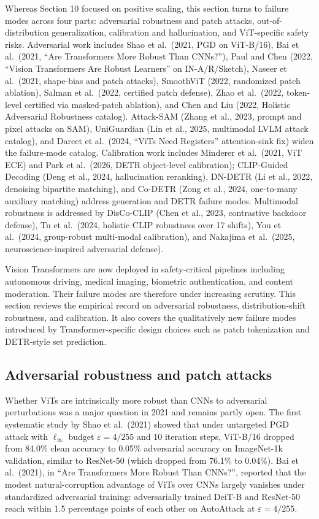 \documentclass{article}
\begin{document}
Whereas Section 10 focused on positive scaling, this section turns to failure modes across four parts: adversarial robustness and patch attacks, out-of-distribution generalization, calibration and hallucination, and ViT-specific safety risks. Adversarial work includes Shao et al.~(2021, PGD on ViT-B/16), Bai et al.~(2021, ``Are Transformers More Robust Than CNNs?''), Paul and Chen (2022, ``Vision Transformers Are Robust Learners'' on IN-A/R/Sketch), Naseer et al.~(2021, shape-bias and patch attacks), SmoothViT (2022, randomized patch ablation), Salman et al.~(2022, certified patch defense), Zhao et al.~(2022, token-level certified via masked-patch ablation), and Chen and Liu (2022, Holistic Adversarial Robustness catalog). Attack-SAM (Zhang et al., 2023, prompt and pixel attacks on SAM), UniGuardian (Lin et al., 2025, multimodal LVLM attack catalog), and Darcet et al.~(2024, ``ViTs Need Registers'' attention-sink fix) widen the failure-mode catalog. Calibration work includes Minderer et al.~(2021, ViT ECE) and Park et al.~(2026, DETR object-level calibration); CLIP-Guided Decoding (Deng et al., 2024, hallucination reranking), DN-DETR (Li et al., 2022, denoising bipartite matching), and Co-DETR (Zong et al., 2024, one-to-many auxiliary matching) address generation and DETR failure modes. Multimodal robustness is addressed by DisCo-CLIP (Chen et al., 2023, contrastive backdoor defense), Tu et al.~(2024, holistic CLIP robustness over 17 shifts), You et al.~(2024, group-robust multi-modal calibration), and Nakajima et al.~(2025, neuroscience-inspired adversarial defense).

Vision Transformers are now deployed in safety-critical pipelines including autonomous driving, medical imaging, biometric authentication, and content moderation. Their failure modes are therefore under increasing scrutiny. This section reviews the empirical record on adversarial robustness, distribution-shift robustness, and calibration. It also covers the qualitatively new failure modes introduced by Transformer-specific design choices such as patch tokenization and DETR-style set prediction.

\subsection{Adversarial robustness and patch attacks}\label{adversarial-robustness-and-patch-attacks}

Whether ViTs are intrinsically more robust than CNNs to adversarial perturbations was a major question in 2021 and remains partly open. The first systematic study by Shao et al.~(2021) showed that under untargeted PGD attack with \(\ell_\infty\) budget \(\varepsilon = 4/255\) and 10 iteration steps, ViT-B/16 dropped from 84.0\% clean accuracy to 0.05\% adversarial accuracy on ImageNet-1k validation, similar to ResNet-50 (which dropped from 76.1\% to 0.04\%). Bai et al.~(2021), in ``Are Transformers More Robust Than CNNs?'', reported that the modest natural-corruption advantage of ViTs over CNNs largely vanishes under standardized adversarial training: adversarially trained DeiT-B and ResNet-50 reach within 1.5 percentage points of each other on AutoAttack at \(\varepsilon = 4/255\).
\end{document}
